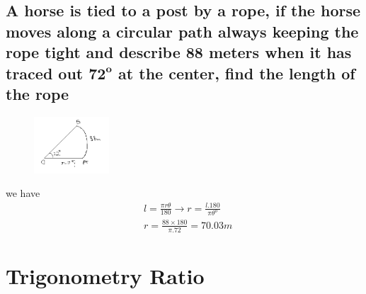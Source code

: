 \documentclass{article}
\begin{document}
\begin{multicols}{2}
\subsection{A horse is tied to a post by a rope, if the horse moves along a circular path always keeping the rope tight and describe 88 meters when it has traced out $\mathbf{72^o}$ at the center, find the length of the rope}

\begin{figure}[H]
    \centering
    \includegraphics[width=0.25\textwidth]{begin-angles7.png}
\end{figure}

we have
\begin{align*}
    &l = \frac{\pi r \theta}{180} \rightarrow r= \frac{l.180}{\pi \theta^o} \\
    &r = \frac{88\times 180}{\pi.72} = 70.03 m
\end{align*}

\end{multicols}

\section{Trigonometry Ratio}
\end{document}
